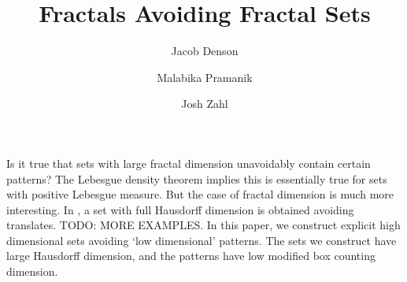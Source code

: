 \documentclass[usenames,dvipsnames]{article}
\title{Fractals Avoiding Fractal Sets}
\author{Jacob Denson\\ \and Malabika Pramanik\\ \and Josh Zahl}
\theoremstyle{plain}
\theoremstyle{plain}
\begin{document}
\maketitle


\begin{abstract}
	\blindtext[1]
\end{abstract}


Is it true that sets with large fractal dimension unavoidably contain certain patterns? The Lebesgue density theorem implies this is essentially true for sets with positive Lebesgue measure. But the case of fractal dimension is much more interesting. In \cite{KeletiDimOneSet}, a set with full Hausdorff dimension is obtained avoiding translates. TODO: MORE EXAMPLES. In this paper, we construct explicit high dimensional sets avoiding `low dimensional' patterns. The sets we construct have large Hausdorff dimension, and the patterns have low modified box counting dimension.


%
%


\end{document}
